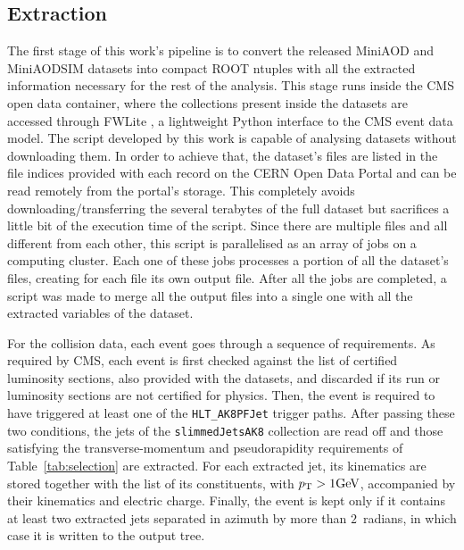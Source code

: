 \subsection{Extraction}
\label{sec:extraction}

The first stage of this work's pipeline is to convert the released MiniAOD and MiniAODSIM datasets
into compact ROOT ntuples with all the extracted information necessary for the rest of the analysis.
This stage runs inside the CMS open data container, where the collections present inside the datasets
are accessed through FWLite \cite{CMS:FWLite}, a lightweight Python interface to the CMS event data
model. The script developed by this work is capable of analysing datasets without downloading them.
In order to achieve that, the dataset's files are listed in the file indices provided with each
record on the CERN Open Data Portal and can be read remotely from the portal's storage. This
completely avoids downloading/transferring the several terabytes of the full dataset but sacrifices
a little bit of the execution time of the script. Since there are multiple files and all different 
from each other, this script is parallelised as an array of jobs on a computing cluster. 
Each one of these jobs processes a portion of all the dataset's files, creating for each file
its own output file. After all the jobs are completed, a script was made to merge all the 
output files into a single one with all the extracted variables of the dataset.

For the collision data, each event goes through a sequence of requirements. As required by CMS,
each event is first checked against the list of certified luminosity sections, also provided 
with the datasets, and discarded if its run or luminosity sections are not certified for physics.
Then, the event is required to have triggered at least one of the \texttt{HLT\_AK8PFJet} trigger
paths. After passing these two conditions, the jets of the \texttt{slimmedJetsAK8} collection are read off
and those satisfying the transverse-momentum and pseudorapidity requirements of
Table~\ref{tab:selection} are extracted. For each extracted jet, its kinematics are
stored together with the list of its constituents, with $p_{\mathrm{T}} > 1 \text{GeV}$, accompanied by their kinematics and electric charge.
Finally, the event is kept only if it contains at least two extracted jets separated in azimuth by more
than $2$~radians, in which case it is written to the output tree.

